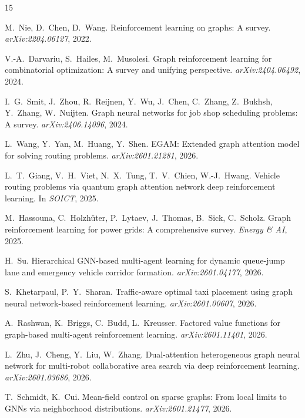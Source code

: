 \documentclass{article}
\begin{document}


\small
\begin{thebibliography}{15}

M.~Nie, D.~Chen, D.~Wang.
Reinforcement learning on graphs: A survey.
\textit{arXiv:2204.06127}, 2022.

V.-A.~Darvariu, S.~Hailes, M.~Musolesi.
Graph reinforcement learning for combinatorial optimization: A survey and unifying perspective.
\textit{arXiv:2404.06492}, 2024.

I.~G.~Smit, J.~Zhou, R.~Reijnen, Y.~Wu, J.~Chen, C.~Zhang, Z.~Bukhsh, Y.~Zhang, W.~Nuijten.
Graph neural networks for job shop scheduling problems: A survey.
\textit{arXiv:2406.14096}, 2024.

L.~Wang, Y.~Yan, M.~Huang, Y.~Shen.
EGAM: Extended graph attention model for solving routing problems.
\textit{arXiv:2601.21281}, 2026.

L.~T.~Giang, V.~H.~Viet, N.~X.~Tung, T.~V.~Chien, W.-J.~Hwang.
Vehicle routing problems via quantum graph attention network deep reinforcement learning.
In \textit{SOICT}, 2025.

M.~Hassouna, C.~Holzh\"{u}ter, P.~Lytaev, J.~Thomas, B.~Sick, C.~Scholz.
Graph reinforcement learning for power grids: A comprehensive survey.
\textit{Energy \& AI}, 2025.

H.~Su.
Hierarchical GNN-based multi-agent learning for dynamic queue-jump lane and emergency vehicle corridor formation.
\textit{arXiv:2601.04177}, 2026.

S.~Khetarpaul, P.~Y.~Sharan.
Traffic-aware optimal taxi placement using graph neural network-based reinforcement learning.
\textit{arXiv:2601.00607}, 2026.

A.~Rashwan, K.~Briggs, C.~Budd, L.~Kreusser.
Factored value functions for graph-based multi-agent reinforcement learning.
\textit{arXiv:2601.11401}, 2026.

L.~Zhu, J.~Cheng, Y.~Liu, W.~Zhang.
Dual-attention heterogeneous graph neural network for multi-robot collaborative area search via deep reinforcement learning.
\textit{arXiv:2601.03686}, 2026.

T.~Schmidt, K.~Cui.
Mean-field control on sparse graphs: From local limits to GNNs via neighborhood distributions.
\textit{arXiv:2601.21477}, 2026.


\end{thebibliography}
\end{document}
